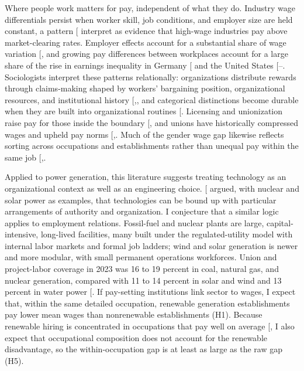 \documentclass[
  11pt,
]{article}
\begin{document}
Where people work matters for pay, independent of what they do. Industry
wage differentials persist when worker skill, job conditions, and
employer size are held constant, a pattern
{[}\citeproc{ref-krueger1988efficiency}{6}{]} interpret as evidence that
high-wage industries pay above market-clearing rates. Employer effects
account for a substantial share of wage variation
{[}\citeproc{ref-abowd1999high}{27}{]}, and growing pay differences
between workplaces account for a large share of the rise in earnings
inequality in Germany {[}\citeproc{ref-card2013workplace}{7}{]} and the
United States
{[}--\citeproc{ref-tomaskovicdevey2020rising}{30}{]}.
Sociologists interpret these patterns relationally: organizations
distribute rewards through claims-making shaped by workers' bargaining
position, organizational resources, and institutional history
{[},\citeproc{ref-wilmers2021consolidated}{31}{]},
and categorical distinctions become durable when they are built into
organizational routines {[}\citeproc{ref-tilly1998durable}{8}{]}.
Licensing and unionization raise pay for those inside the boundary
{[}\citeproc{ref-weeden2002why}{32}{]}, and unions have historically
compressed wages and upheld pay norms
{[},\citeproc{ref-rosenfeld2014unions}{34}{]}.
Much of the gender wage gap likewise reflects sorting across occupations
and establishments rather than unequal pay within the same job
{[},\citeproc{ref-cohen2003individuals}{36}{]}.

Applied to power generation, this literature suggests treating
technology as an organizational context as well as an engineering
choice. {[}\citeproc{ref-winner1980artifacts}{37}{]} argued, with
nuclear and solar power as examples, that technologies can be bound up
with particular arrangements of authority and organization. I conjecture
that a similar logic applies to employment relations. Fossil-fuel and
nuclear plants are large, capital-intensive, long-lived facilities, many
built under the regulated-utility model with internal labor markets and
formal job ladders; wind and solar generation is newer and more modular,
with small permanent operations workforces. Union and project-labor
coverage in 2023 was 16 to 19 percent in coal, natural gas, and nuclear
generation, compared with 11 to 14 percent in solar and wind and 13
percent in water power {[}\citeproc{ref-doe2024useer}{11}{]}. If
pay-setting institutions link sector to wages, I expect that, within the
same detailed occupation, renewable generation establishments pay lower
mean wages than nonrenewable establishments (H1). Because renewable
hiring is concentrated in occupations that pay well on average
{[}\citeproc{ref-curtis2023green}{4}{]}, I also expect that occupational
composition does not account for the renewable disadvantage, so the
within-occupation gap is at least as large as the raw gap (H5).
\end{document}

